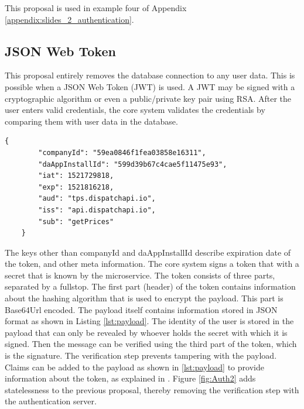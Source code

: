 This proposal is used in example four of Appendix \ref{appendix:slides_2_authentication}.

\subsection{JSON Web Token}
This proposal entirely removes the database connection to any user data. This is possible when a JSON Web Token (JWT) is used. A JWT may be signed with a cryptographic algorithm or even a public/private key pair using RSA. After the user enters valid credentials, the core system validates the credentials by comparing them with user data in the database.

\begin{lstlisting}[caption={Two user identifiers and registered claim names stored inside the payload of a JSON web token.}, label={lst:payload}]
	{
		"companyId": "59ea0846f1fea03858e16311",
		"daAppInstallId": "599d39b67c4cae5f11475e93",
		"iat": 1521729818,
		"exp": 1521816218,
		"aud": "tps.dispatchapi.io",
		"iss": "api.dispatchapi.io",
		"sub": "getPrices"
	}
\end{lstlisting}

The keys other than companyId and daAppInstallId describe expiration date of the token, and other meta information. The core system signs a token that with a secret that is known by the microservice. The token consists of three parts, separated by a fullstop. The first part (header) of the token contains information about the hashing algorithm that is used to encrypt the payload. This part is Base64Url encoded. The payload itself contains information stored in JSON format as shown in Listing \ref{lst:payload}. The identity of the user is stored in the payload that can only be revealed by whoever holds the secret with which it is signed. Then the message can be verified using the third part of the token, which is the signature. The verification step prevents tampering with the payload. Claims can be added to the payload as shown in \ref{lst:payload} to provide information about the token, as explained in \cite{JWT}. Figure \ref{fig:Auth2} adds statelessness to the previous proposal, thereby removing the verification step with the authentication server.

